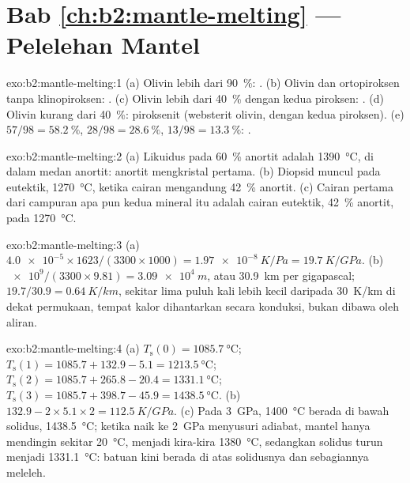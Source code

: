 \section*{Bab \ref{ch:b2:mantle-melting} --- Pelelehan Mantel}

\begin{solution}{exo:b2:mantle-melting:1}
(a) Olivin lebih dari \qty{90}{\percent}: . (b) Olivin dan ortopiroksen
tanpa klinopiroksen: . (c) Olivin lebih dari \qty{40}{\percent} dengan
kedua piroksen: . (d) Olivin kurang dari \qty{40}{\percent}: piroksenit
(websterit olivin, dengan kedua piroksen). (e) $57/98 = \qty{58.2}{\percent}$,
$28/98 = \qty{28.6}{\percent}$, $13/98 = \qty{13.3}{\percent}$: .
\end{solution}

\begin{solution}{exo:b2:mantle-melting:2}
(a) Likuidus pada \qty{60}{\percent} anortit adalah \qty{1390}{\celsius}, di dalam
medan anortit: anortit mengkristal pertama. (b) Diopsid muncul pada
eutektik, \qty{1270}{\celsius}, ketika cairan mengandung \qty{42}{\percent} anortit.
(c) Cairan pertama dari campuran apa pun kedua mineral itu adalah cairan eutektik,
\qty{42}{\percent} anortit, pada \qty{1270}{\celsius}.
\end{solution}

\begin{solution}{exo:b2:mantle-melting:3}
(a) $\num{4.0e-5}\times1623/(3300\times1000) = \qty{1.97e-8}{K/Pa} =
\qty{19.7}{K/GPa}$. (b) $\num{e9}/(3300\times9.81) = \qty{3.09e4}{m}$, atau
\qty{30.9}{km} per gigapascal; $19.7/30.9 = \qty{0.64}{K/km}$, sekitar lima puluh kali
lebih kecil daripada \qty{30}{K/km} di dekat permukaan, tempat kalor dihantarkan secara konduksi, bukan
dibawa oleh aliran.
\end{solution}

\begin{solution}{exo:b2:mantle-melting:4}
(a) $T_{\mathrm s}(0) = \qty{1085.7}{\celsius}$; $T_{\mathrm s}(1) = 1085.7 +
132.9 - 5.1 = \qty{1213.5}{\celsius}$; $T_{\mathrm s}(2) = 1085.7 + 265.8 - 20.4 =
\qty{1331.1}{\celsius}$; $T_{\mathrm s}(3) = 1085.7 + 398.7 - 45.9 =
\qty{1438.5}{\celsius}$. (b) $132.9 - 2\times5.1\times2 = \qty{112.5}{K/GPa}$.
(c) Pada \qty{3}{GPa}, \qty{1400}{\celsius} berada di bawah solidus,
\qty{1438.5}{\celsius}; ketika naik ke \qty{2}{GPa} menyusuri adiabat, mantel hanya mendingin
sekitar \qty{20}{\celsius}, menjadi kira-kira \qty{1380}{\celsius}, sedangkan solidus turun menjadi
\qty{1331.1}{\celsius}: batuan kini berada di atas solidusnya dan sebagiannya meleleh.
\end{solution}

